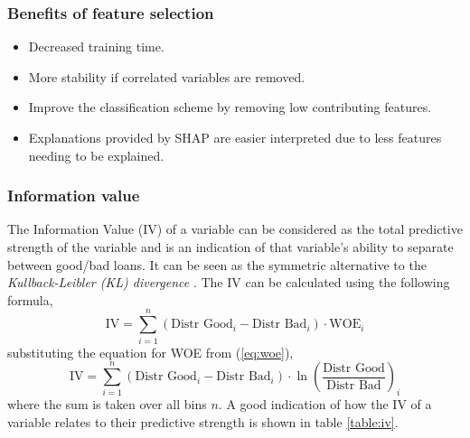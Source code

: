 \subsubsection{Benefits of feature selection}
\begin{itemize}
    \item Decreased training time.
    \item More stability if correlated variables are removed.
    \item Improve the classification scheme by removing low contributing features.
    \item Explanations provided by SHAP are easier interpreted due to less features needing to be explained.
\end{itemize}

\subsubsection{Information value}
 The Information Value (IV) \cite{Siddiqi2005CreditRS} of a variable can be considered as the total predictive strength of the variable and is an indication of that variable’s ability to separate between good/bad loans. It can be seen as the symmetric alternative to the \emph{Kullback-Leibler (KL) divergence} \cite{kullback1951information}. The IV can be calculated using the following formula,
 \begin{equation}
    \mbox{IV} =  \sum^{n}_{i=1}(\mbox{Distr Good}_{i} - \mbox{Distr Bad}_{i}) \cdot \mbox{WOE}_{i}
 \end{equation}
 substituting the equation for WOE from (\ref{eq:woe}),
 \begin{equation}
     \mbox{IV} = \sum^{n}_{i=1}(\mbox{Distr Good}_{i} - \mbox{Distr Bad}_{i}) \cdot \ln{\left(\frac{\mbox{Distr Good}}{\mbox{Distr Bad}}\right)}_{i}
 \end{equation}
 where the sum is taken over all bins $n$.
 A good indication of how the IV of a variable relates to their predictive strength is shown in table \ref{table:iv}.
 \begin{table}[h!]
\begin{center}
\shadowbox{\begin{minipage}[t]{0.4\columnwidth}%
    \begin{tabular}{cl}
       \textbf{IV range}  &  \textbf{Interpretation}\\
       \hline\\
        $<0.02$ & Not predictive\\
        $[0.02,0.1)$ & Weak predictive\\
        $[0.1, 0.3)$ & Medium predictive\\
        $[0.3,0.5)$ & Strong predictive\\
        $>0.5$ & Suspicious \\
    \end{tabular}
    \end{minipage}}
\par\end{center}
\caption{IV Interpretation}\label{table:iv}
\end{table}
